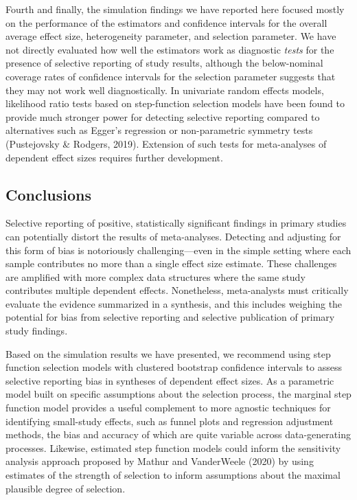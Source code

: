 \documentclass[
  american,
  man, donotrepeattitle,floatsintext]{apa7}
\begin{document}
Fourth and finally, the simulation findings we have reported here focused mostly on the performance of the estimators and confidence intervals for the overall average effect size, heterogeneity parameter, and selection parameter.
We have not directly evaluated how well the estimators work as diagnostic \emph{tests} for the presence of selective reporting of study results, although the below-nominal coverage rates of confidence intervals for the selection parameter suggests that they may not work well diagnostically.
In univariate random effects models, likelihood ratio tests based on step-function selection models have been found to provide much stronger power for detecting selective reporting compared to alternatives such as Egger's regression or non-parametric symmetry tests (Pustejovsky \& Rodgers, 2019).
Extension of such tests for meta-analyses of dependent effect sizes requires further development.

\subsection{Conclusions}\label{conclusions}

Selective reporting of positive, statistically significant findings in primary studies can potentially distort the results of meta-analyses.
Detecting and adjusting for this form of bias is notoriously challenging---even in the simple setting where each sample contributes no more than a single effect size estimate.
These challenges are amplified with more complex data structures where the same study contributes multiple dependent effects.
Nonetheless, meta-analysts must critically evaluate the evidence summarized in a synthesis, and this includes weighing the potential for bias from selective reporting and selective publication of primary study findings.

Based on the simulation results we have presented, we recommend using step function selection models with clustered bootstrap confidence intervals to assess selective reporting bias in syntheses of dependent effect sizes. As a parametric model built on specific assumptions about the selection process, the marginal step function model provides a useful complement to more agnostic techniques for identifying small-study effects, such as funnel plots and regression adjustment methods, the bias and accuracy of which are quite variable across data-generating processes. Likewise, estimated step function models could inform the sensitivity analysis approach proposed by Mathur and VanderWeele (2020) by using estimates of the strength of selection to inform assumptions about the maximal plausible degree of selection.
\end{document}
